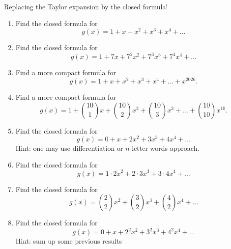 \documentclass[12pt]{article}
\begin{document}
\begin{exercise}
    Replacing the Taylor expansion by the closed formula!
    \begin{enumerate}[label=\alph*)]
        \item Find the closed formula for 
        \[
        g(x) = 1 + x + x^2 + x^3 + x^4 + \dots 
        \]
        \item Find the closed formula for 
        \[
        g(x) = 1 + 7x + 7^2x^2 + 7^3x^3 + 7^4x^4 + \dots 
        \]
        \item Find a more compact formula for 
        \[
        g(x) = 1 + x + x^2 + x^3 + x^4 + \dots + x^{2026}.
        \]
        \item Find a more compact formula for
        \[
        g(x) = 1 + {10 \choose 1}x + {10 \choose 2}x^2 + {10 \choose 3} x^3 + \dots + {10 \choose 10}x^{10}.
        \]
        \item Find the closed formula for 
        \[
        g(x) = 0 + x + 2x^2 + 3x^3 + 4x^4 + \dots 
        \]
        Hint: one may use differentiation or $n$-letter words approach. 
        \item Find the closed formula for 
        \[
        g(x) = 1\cdot 2 x^2 + 2\cdot 3 x^3 + 3 \cdot 4 x^4 + \dots 
        \]
        \item Find the closed formula for 
        \[
        g(x) = {2 \choose 2} x^2 + {3 \choose 2} x^3 + {4 \choose 2} x^4 + \dots 
        \]
        \item Find the closed formula for 
        \[
        g(x) = 0 + x + 2^2x^2 + 3^2x^3 + 4^2x^4 + \dots 
        \]
        Hint: sum up some previous results
    \end{enumerate}
\end{exercise}
\end{document}
